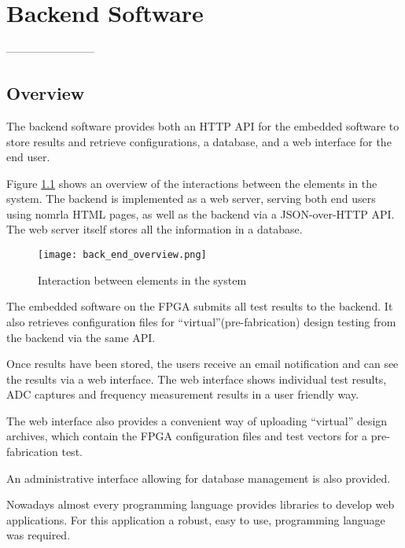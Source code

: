 \chapter{Backend Software}
------------------------

\section{Overview}
The backend software provides both an HTTP API for the embedded software to store results and
retrieve configurations, a database, and a web interface for the end user.

Figure \ref{fig:back_end_structure} shows an overview of the interactions between
the elements in the system. The backend is implemented as a web server, serving both
end users using nomrla HTML pages, as well as the backend via a JSON-over-HTTP API.
The web server itself stores all the information in a database.
\begin{figure}[htb]
\centering
\texttt{[image: back\_end\_overview.png]}
\caption{Interaction between elements in the system}
\label{fig:back_end_structure}
\end{figure}

The embedded software on the FPGA submits all test results to the backend. It also
retrieves configuration files for ``virtual''(pre-fabrication) design testing from the
backend via the same API.

Once results have been stored, the users receive an email notification and can
see the results via a web interface. The web interface shows individual test
results, ADC captures and frequency measurement results in a user friendly way.

The web interface also provides a convenient way of uploading ``virtual'' design
archives, which contain the FPGA configuration files and test vectors for a pre-fabrication
test.

An administrative interface allowing for database management is also provided.



 Nowadays almost every programming language provides libraries to develop web
applications. For this application a robust, easy to use, programming language was required.

